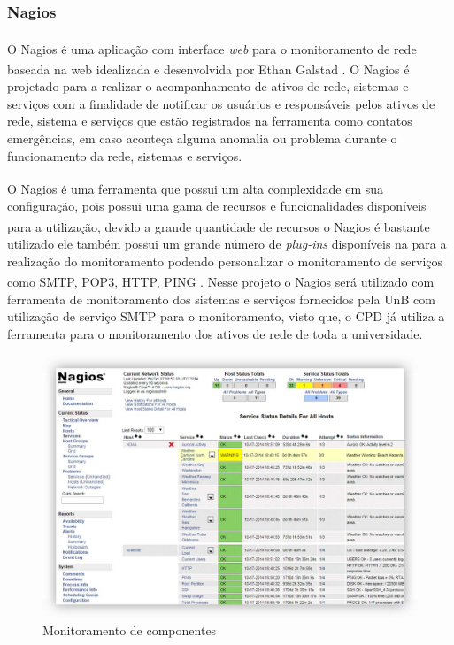 \subsubsection{Nagios\textsuperscript{\textregistered}}

O Nagios\textsuperscript{\textregistered} é uma aplicação com interface \textit{web} para o monitoramento de rede baseada na web idealizada e desenvolvida por Ethan Galstad \cite{bin2011new}. O Nagios\textsuperscript{\textregistered} é projetado para a realizar o acompanhamento de ativos de rede, sistemas e serviços com a finalidade de notificar os usuários e responsáveis pelos ativos de rede, sistema e serviços que estão registrados na ferramenta como contatos emergências, em caso aconteça alguma anomalia ou problema durante o funcionamento da rede, sistemas e serviços.

O Nagios\textsuperscript{\textregistered} é uma ferramenta que possui um alta complexidade em sua configuração, pois possui uma gama de recursos e funcionalidades disponíveis para a utilização, devido a grande quantidade de recursos o Nagios\textsuperscript{\textregistered} é bastante utilizado ele também possui um grande número de \textit{plug-ins} disponíveis na para a realização do monitoramento podendo personalizar o monitoramento de serviços como SMTP, POP3, HTTP, PING \cite{lcc2012nagios}. Nesse projeto o Nagios\textsuperscript{\textregistered} será utilizado com ferramenta de monitoramento dos sistemas e serviços fornecidos pela \acrshort{UnB} com utilização de serviço SMTP para o monitoramento, visto que, o \acrshort{CPD} já utiliza a ferramenta para o monitoramento dos ativos de rede de toda a universidade. 

\begin{figure}[H]
	\begin{center}
	\includegraphics[scale = 0.39]{img/Comprehensive_Monitoring_Drop2.jpg}
		\caption{Monitoramento de componentes\cite{lcc2012nagios}}
		\label{fun:fig:nagios}
	\end{center}
\end{figure}

